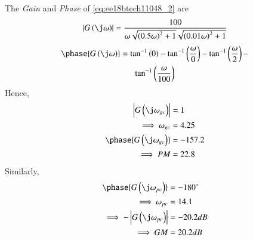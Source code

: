 \begin{enumerate}[label=\thesection.\arabic*.,ref=\thesection.\theenumi]
The  {\em Gain} and {\em Phase} of \eqref{eq:ee18btech11048_2} are
\begin{align}
\abs{G\brak{\j\omega}}  =  \frac{100}{\omega\sqrt{\brak{0.5\omega}^2+1}\sqrt{\brak{0.01\omega}^2+1}}
\label{eq:ee18btech11048_2}
\end{align}
\begin{multline}
\phase{G\brak{\j\omega}}  =  \tan^{-1} \brak{0}-\tan^{-1} \brak{\frac{\omega}{0}} - \tan^{-1} \brak{\frac{\omega}{2}}- \\\tan^{-1} \brak{\frac{\omega}{100}} 
\label{eq:ee18btech11048_3}
\end{multline}
Hence, 
\begin{align}
\abs{G\brak{\j\omega_{gc}}}  &=  1
\\
\implies \omega_{gc} &= 4.25  
\\
\phase{ G\brak{\j\omega_{gc}}} &= -157.2 \\
\implies PM &= 22.8 
\end{align}
%
Similarly, 
\begin{align}
\phase{G\brak{\j\omega_{pc}}}  &= -180\degree
\\
\implies
\omega_{pc} &=  14.1 \\
\implies -\abs{G\brak{\j\omega_{pc}}}  &= -20.2 dB \\
\implies
GM &= 20.2 dB
\end{align}

\end{enumerate}
